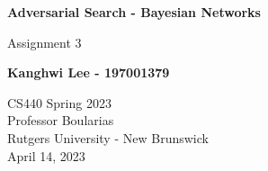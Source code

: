 \documentclass[11pt]{article}
\begin{document}
    \begin{titlepage}
        \begin{center}
            \vspace{1cm}

            \Huge
            \textbf{Adversarial Search - Bayesian Networks}

            \vspace{0.5cm}
            \LARGE
            Assignment 3

            \vspace{1cm}

            \textbf{Kanghwi Lee - 197001379}

            \textbf{}

            \textbf{}


            \vfill


            \vspace{0.8cm}

            \Large
            CS440 Spring 2023\\
            Professor Boularias\\
            Rutgers University - New Brunswick\\
            April 14, 2023

        \end{center}
    \end{titlepage}
\end{document}
